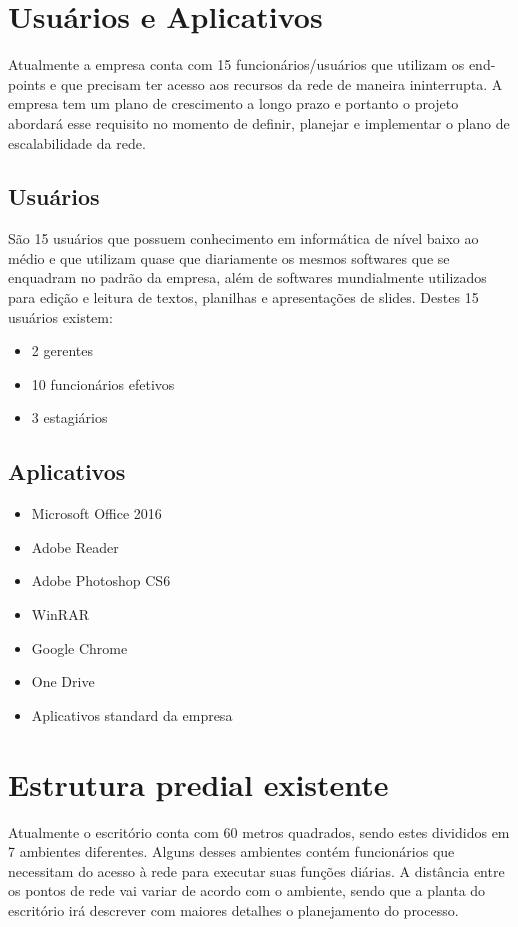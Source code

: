 \documentclass[	DIV=calc,%
							paper=a4,%
							fontsize=12pt,%
							onecolumn]{scrartcl}	 					%
\begin{document}
\section{Usuários e Aplicativos}
Atualmente a empresa conta com 15 funcionários/usuários que utilizam os end-points e que precisam ter acesso aos recursos da rede de maneira ininterrupta. A empresa tem um plano de crescimento a longo prazo e portanto o projeto abordará esse requisito no momento de definir, planejar e implementar o plano de escalabilidade da rede.
 

\subsection{Usuários}
São 15 usuários que possuem conhecimento em informática de nível baixo ao médio e que utilizam quase que diariamente os mesmos softwares que se enquadram no padrão da empresa, além de softwares mundialmente utilizados para edição e leitura de textos, planilhas e apresentações de slides.
Destes 15 usuários existem:

\begin{itemize}
	\item 2 gerentes
	\item 10 funcionários efetivos
	\item 3 estagiários

	
\end{itemize}

\subsection{Aplicativos}
\begin{itemize}
	\item Microsoft Office 2016
	\item Adobe Reader
	\item Adobe Photoshop CS6
	\item WinRAR
	\item Google Chrome
	\item One Drive
	\item Aplicativos standard da empresa
	
	
\end{itemize}


\section{Estrutura predial existente}

Atualmente o escritório conta com 60 metros quadrados, sendo estes divididos em 7 ambientes diferentes. Alguns desses ambientes contém funcionários que necessitam do acesso à rede para executar suas funções diárias. A distância entre os pontos de rede vai variar de acordo com o ambiente, sendo que a planta do escritório irá descrever com maiores detalhes o planejamento do processo.
\end{document}
